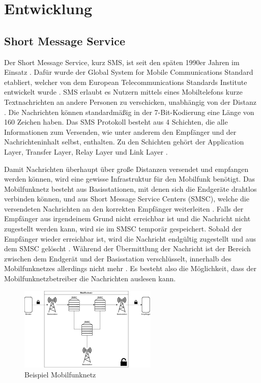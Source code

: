 \documentclass[conference]{IEEEtran}
\begin{document}
\section{Entwicklung}

\subsection{Short Message Service}

Der Short Message Service, kurz SMS, ist seit den späten 1990er Jahren im Einsatz \cite{sendoutsms}.
Dafür wurde der Global System for Mobile Communications Standard etabliert, welcher von dem European Telecommunications Standards Institute entwickelt wurde \cite{smshow}.
SMS erlaubt es Nutzern mittels eines Mobiltelefons kurze Textnachrichten an andere Personen zu verschicken, unabhängig von der Distanz \cite{sendoutsms}.
Die Nachrichten können standardmäßig in der 7-Bit-Kodierung eine Länge von 160 Zeichen haben.
Das SMS Protokoll besteht aus 4 Schichten, die alle Informationen zum Versenden, wie unter anderem den Empfänger und der Nachrichteninhalt selbst, enthalten.
Zu den Schichten gehört der Application Layer, Transfer Layer, Relay Layer und Link Layer \cite{smshow}.

Damit Nachrichten überhaupt über große Distanzen versendet und empfangen werden können, wird eine gewisse Infrastruktur für den Mobilfunk benötigt.
Das Mobilfunknetz besteht aus Basisstationen, mit denen sich die Endgeräte drahtlos verbinden können, und aus Short Message Service Centers (SMSC), welche die versendeten Nachrichten an den korrekten Empfänger weiterleiten \cite{sendoutsms}.
Falls der Empfänger aus irgendeinem Grund nicht erreichbar ist und die Nachricht nicht zugestellt werden kann, wird sie im SMSC temporär gespeichert. Sobald der Empfänger wieder erreichbar ist, wird die Nachricht endgültig zugestellt und aus dem SMSC gelöscht \cite{smshow}.
Während der Übermittlung der Nachricht ist der Bereich zwischen dem Endgerät und der Basisstation verschlüsselt, innerhalb des Mobilfunknetzes allerdings nicht mehr \cite{sendoutsms}. Es besteht also die Möglichkeit, dass der Mobilfunknetzbetreiber die Nachrichten auslesen kann.

\begin{figure}[htbp]
    \centerline{\includegraphics{mobilfunknetz.png}}
    \caption{Beispiel Mobilfunknetz}
\end{figure}
\end{document}
